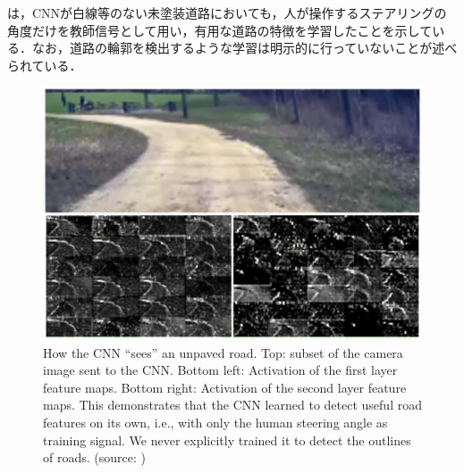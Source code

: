 \newpage

     は，CNNが白線等のない未塗装道路においても，人が操作するステアリングの角度だけを教師信号として用い，有用な道路の特徴を学習したことを示している．なお，道路の輪郭を検出するような学習は明示的に行っていないことが述べられている．

     \begin{figure}[h]
          \centering
          \includegraphics[keepaspectratio, scale=0.35] {images/eps/bojarski_CNN.eps}
          \captionsetup{justification=raggedright} %
          \caption[How the CNN ``sees'' an unpaved road. Top: subset of the camera image sent to the CNN. Bottom left: Activation of the first layer feature maps. Bottom right: Activation of the second layer feature maps. This demonstrates that the CNN learned to detect useful road features on its own, i.e., with only the human steering angle as training signal. We never explicitly trained it to detect the outlines of roads.]{How the CNN ``sees'' an unpaved road. Top: subset of the camera image sent to the CNN. Bottom left: Activation of the first layer feature maps. Bottom right: Activation of the second layer feature maps. This demonstrates that the CNN learned to detect useful road features on its own, i.e., with only the human steering angle as training signal. We never explicitly trained it to detect the outlines of roads. (source: \cite{bojarski})}
          \label{Fig:bojarski_CNN}
     \end{figure}

\newpage
